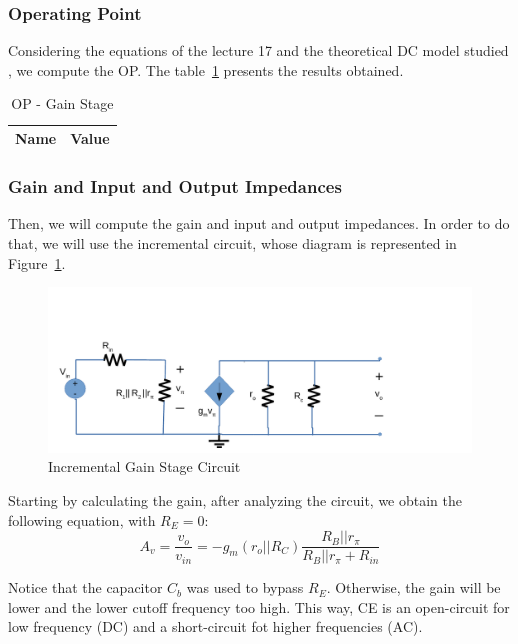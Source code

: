 \subsubsection{Operating Point}
Considering the equations of the lecture 17 and the theoretical DC model studied , we compute the OP. The table~\ref{tab:opgs} presents the results obtained.

\begin{table}[H]
  \centering
  \begin{tabular}{|l|r|}
     \hline    
    {\bf Name} & {\bf Value} \\ \hline   
    
  \end{tabular}
  \caption{OP - Gain Stage}
  \label{tab:opgs}
\end{table}

\subsubsection{Gain and Input and Output Impedances}
Then, we will compute the gain and input and output impedances. In order to do that, we will  use the incremental circuit, whose diagram is represented in Figure~\ref{fig:gsincrem}.

\begin{figure}[H] \centering
\includegraphics[width=0.8\linewidth]{incrementalgs.pdf}
\caption{Incremental Gain Stage Circuit}                         %
\label{fig:gsincrem}
\end{figure}

Starting by calculating the gain, after analyzing the circuit, we obtain the following equation, with $R_E=0$: 
\begin{equation}
	A_v=\frac{v_o}{v_{in}}=-g_m(r_o||R_C)\frac{R_B||r_\pi}{R_B||r_\pi+R_{in}}
\end{equation}

Notice that the capacitor $C_b$ was used to bypass $R_E$. Otherwise, the gain will be lower and the lower cutoff frequency too high.
This way, CE is an open-circuit for low frequency (DC) and a short-circuit fot higher frequencies (AC).

